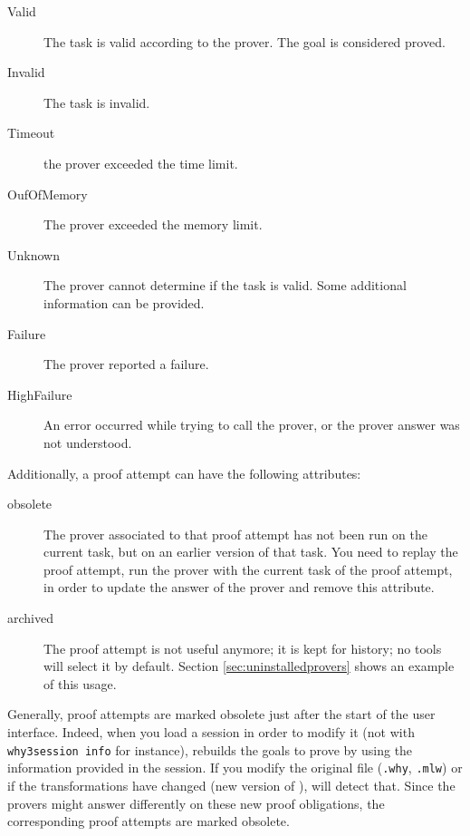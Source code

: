 \begin{description}
\item[Valid] The task is valid according to the prover. The
  goal is considered proved.
\item[Invalid] The task is invalid.
\item[Timeout] the prover exceeded the time limit.
\item[OufOfMemory] The prover exceeded the memory limit.
\item[Unknown] The prover cannot determine if the task
  is valid. Some additional information can be provided.
\item[Failure] The prover reported a failure.
\item[HighFailure] An error occurred while trying to call the
  prover, or the prover answer was not understood.
\end{description}

Additionally, a proof attempt can have the following attributes:

\begin{description}
\item[obsolete] The prover associated to
  that proof attempt has not been run on the current task, but on an
  earlier version of that task. You need to replay the proof
  attempt, \ie run the prover with the current task of the proof
  attempt, in order to update the answer of the prover and remove this
  attribute.
\item[archived] The proof attempt is not useful
  anymore; it is kept for history; no \why tools will select it by
  default. Section \ref{sec:uninstalledprovers} shows an example
  of this usage.
\end{description}

Generally, proof attempts are marked obsolete just after
the start of the user interface. Indeed, when you load a session in order to
modify it (not with \texttt{why3session info} for instance), \why
rebuilds the goals to prove by using the information provided in the
session. If you modify the original file (\texttt{.why}, \texttt{.mlw}) or if the
transformations have changed (new version of \why), \why will detect
that. Since the provers might answer differently on these new
proof obligations, the corresponding proof attempts are marked obsolete.


